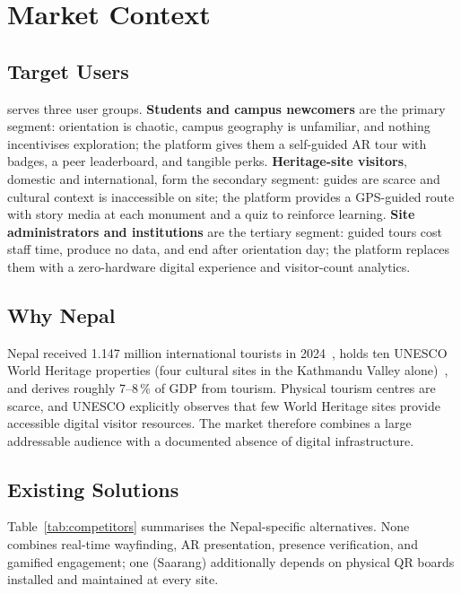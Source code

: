 \chapter{Market Context}
\label{ch:market-analysis}

\section{Target Users}
\projectname{} serves three user groups. \textbf{Students and campus
newcomers} are the primary segment: orientation is chaotic, campus geography
is unfamiliar, and nothing incentivises exploration; the platform gives them
a self-guided AR tour with badges, a peer leaderboard, and tangible perks.
\textbf{Heritage-site visitors}, domestic and international, form the
secondary segment: guides are scarce and cultural context is inaccessible on
site; the platform provides a GPS-guided route with story media at each
monument and a quiz to reinforce learning. \textbf{Site administrators and
institutions} are the tertiary segment: guided tours cost staff time, produce
no data, and end after orientation day; the platform replaces them with a
zero-hardware digital experience and visitor-count analytics.

\section{Why Nepal}
Nepal received 1.147 million international tourists in
2024~\cite{nepaltourism2024},
holds ten UNESCO World Heritage properties (four cultural sites in the
Kathmandu Valley alone)~\cite{unesconepal},
and derives roughly 7--8\,\% of GDP from tourism. Physical tourism centres
are scarce, and UNESCO explicitly observes that few World Heritage sites
provide accessible digital visitor resources. The market therefore combines
a large addressable audience with a documented absence of digital
infrastructure.

\section{Existing Solutions}
Table~\ref{tab:competitors} summarises the Nepal-specific alternatives. None
combines real-time wayfinding, AR presentation, presence verification, and
gamified engagement; one (Saarang) additionally depends on physical QR
boards installed and maintained at every site.

